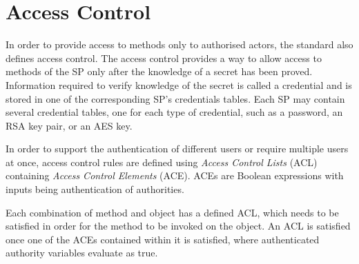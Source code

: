 





\section{Access Control}
\label{section:access_control}

In order to provide access to methods only to authorised actors, the standard also defines access control. The access control provides a way to allow access to methods of the SP only after the knowledge of a secret has been proved. Information required to verify knowledge of the secret is called a credential and is stored in one of the corresponding SP's credentials tables. Each SP may contain several credential tables, one for each type of credential, such as a password, an RSA key pair, or an AES key.

In order to support the authentication of different users or require multiple users at once, access control rules are defined using \emph{Access Control Lists} (ACL) containing \emph{Access Control Elements} (ACE). ACEs are Boolean expressions with inputs being authentication of authorities.

Each combination of method and object has a defined ACL, which needs to be satisfied in order for the method to be invoked on the object. An ACL is satisfied once one of the ACEs contained within it is satisfied, where authenticated authority variables evaluate as true.




